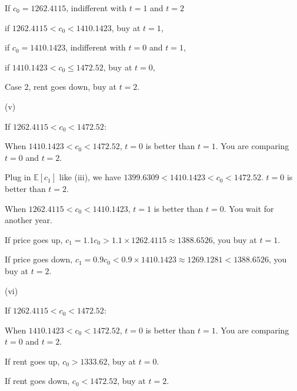 \documentclass{article}
\begin{document}
If $c_{0}=1262.4115$, indifferent with $t=1$ and $t=2$

if $1262.4115<c_{0}<1410.1423$, buy at $t=1$,

if $c_{0}=1410.1423$, indifferent with $t=0$ and $t=1$,

if $1410.1423<c_{0}\leqslant1472.52$, buy at $t=0$,

Case 2, rent goes down, buy at $t=2$.

(v)

If $1262.4115<c_{0}<1472.52$:

When $1410.1423<c_{0}<1472.52$, $t=0$ is better than $t=1$. You are comparing $t=0$ and $t=2$.

Plug in $\mathbb{E} \left[c_{1}\right]$ like (iii), we have $1399.6309<1410.1423<c_{0}<1472.52$. $t=0$ is better than $t=2$.

When $1262.4115<c_{0}<1410.1423$, $t=1$ is better than $t=0$. You wait for another year.

If price goes up, $c_{1}=1.1c_{0}>1.1\times1262.4115\approx1388.6526$, you buy at $t=1$.

If price goes down, $c_{1}=0.9c_{0}<0.9\times1410.1423\approx1269.1281<1388.6526$, you buy at $t=2$.


(vi)

If $1262.4115<c_{0}<1472.52$:

When $1410.1423<c_{0}<1472.52$, $t=0$ is better than $t=1$. You are comparing $t=0$ and $t=2$.

If rent goes up, $c_{0}>1333.62$, buy at $t=0$.

If rent goes down, $c_{0}<1472.52$, buy at $t=2$.
\end{document}
